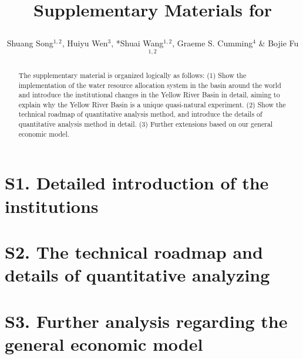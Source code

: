 \documentclass{article}
\title{Supplementary Materials for

}
\author{Shuang Song$^{1,2}$, Huiyu Wen$^3$, *Shuai Wang$^{1,2}$, Graeme S. Cumming$^{4}$ \& Bojie Fu$^{1, 2}$}
\begin{document}
\maketitle

\begin{abstract}
    The supplementary material is organized logically as follows:
    (1) Show the implementation of the water resource allocation system in the basin around the world and introduce the institutional changes in the Yellow River Basin in detail, aiming to explain why the Yellow River Basin is a unique quasi-natural experiment.
    (2) Show the technical roadmap of quantitative analysis method, and introduce the details of quantitative analysis method in detail.
    (3) Further extensions based on our general economic model.
\end{abstract}

\section*{S1. Detailed introduction of the institutions}


\section*{S2. The technical roadmap and details of quantitative analyzing}


\section*{S3. Further analysis regarding the general economic model}



\end{document}

